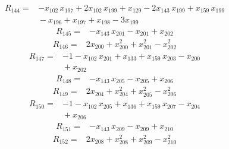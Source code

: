 \documentclass[11pt]{article}
\begin{document}
\begin{equation*}\begin{aligned}
R_{144}={}&-x_{102}\,x_{197} + 2x_{102}\,x_{199} + x_{129} - 2x_{143}\,x_{199} + x_{159}\,x_{199} \\
&{} - x_{196} + x_{197} + x_{198} - 3x_{199}
\end{aligned}\end{equation*}
\begin{equation*}\begin{aligned}
R_{145}={}&-x_{143}\,x_{201} - x_{201} + x_{202}
\end{aligned}\end{equation*}
\begin{equation*}\begin{aligned}
R_{146}={}&2x_{200} + x_{200}^{2} + x_{201}^{2} - x_{202}^{2}
\end{aligned}\end{equation*}
\begin{equation*}\begin{aligned}
R_{147}={}&-1 - x_{102}\,x_{201} + x_{133} + x_{159}\,x_{203} - x_{200} \\
&{} + x_{202}
\end{aligned}\end{equation*}
\begin{equation*}\begin{aligned}
R_{148}={}&-x_{143}\,x_{205} - x_{205} + x_{206}
\end{aligned}\end{equation*}
\begin{equation*}\begin{aligned}
R_{149}={}&2x_{204} + x_{204}^{2} + x_{205}^{2} - x_{206}^{2}
\end{aligned}\end{equation*}
\begin{equation*}\begin{aligned}
R_{150}={}&-1 - x_{102}\,x_{205} + x_{136} + x_{159}\,x_{207} - x_{204} \\
&{} + x_{206}
\end{aligned}\end{equation*}
\begin{equation*}\begin{aligned}
R_{151}={}&-x_{143}\,x_{209} - x_{209} + x_{210}
\end{aligned}\end{equation*}
\begin{equation*}\begin{aligned}
R_{152}={}&2x_{208} + x_{208}^{2} + x_{209}^{2} - x_{210}^{2}
\end{aligned}\end{equation*}
\end{document}

